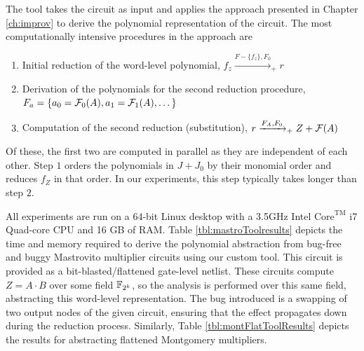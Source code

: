 The tool takes the circuit as input
and applies the approach presented in Chapter \ref{ch:improv}
to derive the polynomial representation of the circuit.
The most computationally intensive procedures in the approach are
\begin{enumerate}
\item Initial reduction of the word-level polynomial, 
$f_z \xrightarrow{F-\{f_z\},F_0}_+ r$ %
\item Derivation of the polynomials for the second reduction procedure, 
$F_a=\{a_0={\mathcal{F}}_0(A), a_1={\mathcal{F}}_1(A), \dots\}$ %
\item Computation of the second reduction (substitution), $r\xrightarrow{F_A,F_0}_+ Z+{\mathcal{F}}(A)$ %
\end{enumerate}
Of these, the first two are computed in parallel as they are independent of each 
other. Step $1$ orders the polynomials in $J+J_0$ by their
monomial order and reduces $f_Z$ in that order. In our experiments, this step typically
takes longer than step $2$.


All experiments are run on a 64-bit Linux desktop with a
3.5GHz Intel $\text{Core}^\text{TM}$ i7 Quad-core CPU and 16 GB of RAM.
Table \ref{tbl:mastroToolresults} depicts the time and memory required to derive
 the polynomial abstraction
from bug-free and buggy Mastrovito multiplier circuits using our custom tool. 
This circuit is provided as a bit-blasted/flattened gate-level netlist. These 
circuits compute $Z = A \cdot B$ over some field ${\mathbb{F}}_{2^k}$, so the analysis is performed over
this same field, abstracting this word-level representation.
The bug introduced is a swapping of two output nodes of the given circuit,
ensuring that the effect propagates down during the reduction process.
Similarly, Table \ref{tbl:montFlatToolResults} depicts the results for abstracting flattened Montgomery
multipliers.


